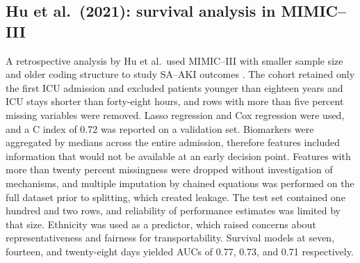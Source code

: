 \subsection{Hu et al.\ (2021): survival analysis in MIMIC--III}
A retrospective analysis by Hu et al.\ used MIMIC--III with smaller sample size and older coding structure to study SA--AKI outcomes \citep{Hu_2021}. The cohort retained only the first ICU admission and excluded patients younger than eighteen years and ICU stays shorter than forty-eight hours, and rows with more than five percent missing variables were removed. Lasso regression and Cox regression were used, and a C index of 0.72 was reported on a validation set. Biomarkers were aggregated by medians across the entire admission, therefore features included information that would not be available at an early decision point. Features with more than twenty percent missingness were dropped without investigation of mechanisms, and multiple imputation by chained equations was performed on the full dataset prior to splitting, which created leakage. The test set contained one hundred and two rows, and reliability of performance estimates was limited by that size. Ethnicity was used as a predictor, which raised concerns about representativeness and fairness for transportability. Survival models at seven, fourteen, and twenty-eight days yielded AUCs of 0.77, 0.73, and 0.71 respectively.

